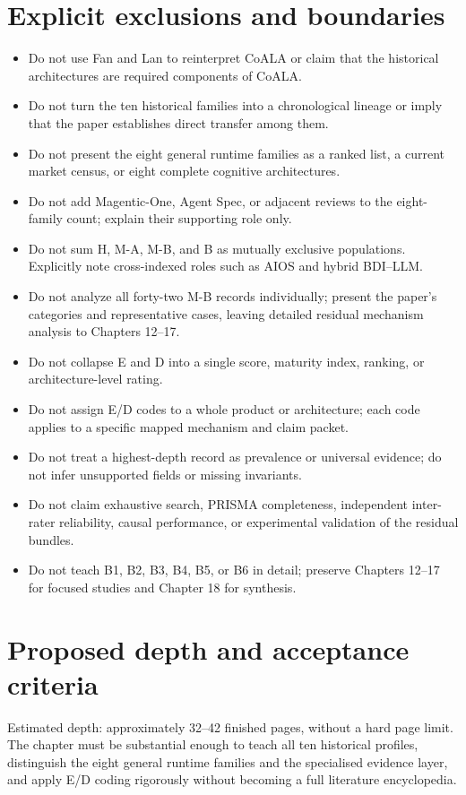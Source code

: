 \section{Explicit exclusions and boundaries}
\begin{itemize}
  \item Do not use Fan and Lan to reinterpret CoALA or claim that the historical architectures are required components of CoALA.
  \item Do not turn the ten historical families into a chronological lineage or imply that the paper establishes direct transfer among them.
  \item Do not present the eight general runtime families as a ranked list, a current market census, or eight complete cognitive architectures.
  \item Do not add Magentic-One, Agent Spec, or adjacent reviews to the eight-family count; explain their supporting role only.
  \item Do not sum H, M-A, M-B, and B as mutually exclusive populations. Explicitly note cross-indexed roles such as AIOS and hybrid BDI--LLM.
  \item Do not analyze all forty-two M-B records individually; present the paper's categories and representative cases, leaving detailed residual mechanism analysis to Chapters 12--17.
  \item Do not collapse E and D into a single score, maturity index, ranking, or architecture-level rating.
  \item Do not assign E/D codes to a whole product or architecture; each code applies to a specific mapped mechanism and claim packet.
  \item Do not treat a highest-depth record as prevalence or universal evidence; do not infer unsupported fields or missing invariants.
  \item Do not claim exhaustive search, PRISMA completeness, independent inter-rater reliability, causal performance, or experimental validation of the residual bundles.
  \item Do not teach B1, B2, B3, B4, B5, or B6 in detail; preserve Chapters 12--17 for focused studies and Chapter 18 for synthesis.
\end{itemize}

\section{Proposed depth and acceptance criteria}
Estimated depth: approximately 32--42 finished pages, without a hard page limit. The chapter must be substantial enough to teach all ten historical profiles, distinguish the eight general runtime families and the specialised evidence layer, and apply E/D coding rigorously without becoming a full literature encyclopedia.

